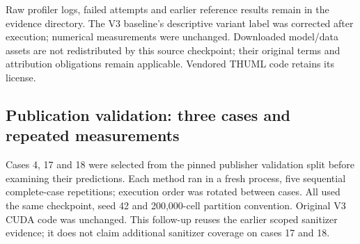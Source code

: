 \documentclass[
  10pt,
]{article}
\begin{document}
Raw profiler logs, failed attempts and earlier reference results remain
in the evidence directory. The V3 baseline's descriptive variant label
was corrected after execution; numerical measurements were unchanged.
Downloaded model/data assets are not redistributed by this source
checkpoint; their original terms and attribution obligations remain
applicable. Vendored THUML code retains its license.

\subsection{Publication validation: three cases and repeated
measurements}\label{publication-validation-three-cases-and-repeated-measurements}

Cases 4, 17 and 18 were selected from the pinned publisher validation
split before examining their predictions. Each method ran in a fresh
process, five sequential complete-case repetitions; execution order was
rotated between cases. All used the same checkpoint, seed 42 and
200,000-cell partition convention. Original V3 CUDA code was unchanged.
This follow-up reuses the earlier scoped sanitizer evidence; it does not
claim additional sanitizer coverage on cases 17 and 18.
\end{document}
